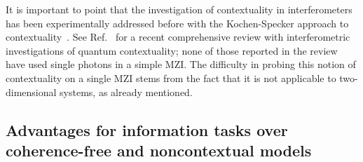 \documentclass[letterpaper,onecolumn,12pt,accepted=2024-01-17]{article}
\begin{document}
It is important to point that the investigation of contextuality in interferometers has been experimentally addressed before with the Kochen-Specker approach to contextuality~\cite{borges2014quantum,liu2009experimental}. See Ref.~\cite{Budroni21} for a recent comprehensive review with interferometric investigations of quantum contextuality; none of those reported in the review have used single photons in a simple MZI. The difficulty in probing this notion of contextuality on a single MZI stems from the fact that it is not applicable to two-dimensional systems, as already mentioned. 

\subsection{Advantages for information tasks over coherence-free and noncontextual models}\label{subsec: Generic advantages}
\end{document}
